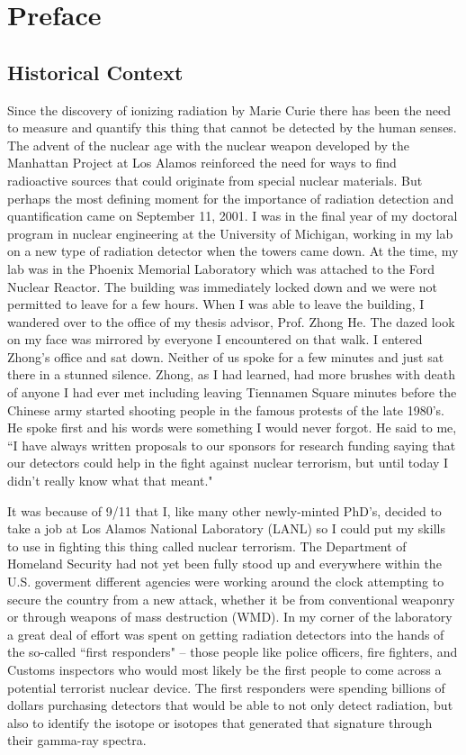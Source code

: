 \chapter{Preface}

\section{Historical Context}

Since the discovery of ionizing radiation by Marie Curie there has been the need to measure and quantify this thing that cannot be detected by the human senses.  The advent of the nuclear age with the nuclear weapon developed by the Manhattan Project at Los Alamos reinforced the need for ways to find radioactive sources that could originate from special nuclear materials.  But perhaps the most defining moment for the importance of radiation detection and quantification came on September 11, 2001.  I was in the final year of my doctoral program in nuclear engineering at the University of Michigan, working in my lab on a new type of radiation detector when the towers came down.  At the time, my lab was in the Phoenix Memorial Laboratory which was attached to the Ford Nuclear Reactor.  The building was immediately locked down and we were not permitted to leave for a few hours.  When I was able to leave the building, I wandered over to the office of my thesis advisor, Prof. Zhong He.  The dazed look on my face was mirrored by everyone I encountered on that walk.  I entered Zhong's office and sat down.  Neither of us spoke for a few minutes and just sat there in a stunned silence.  Zhong, as I had learned, had more brushes with death of anyone I had ever met including leaving Tiennamen Square minutes before the Chinese army started shooting people in the famous protests of the late 1980's.  He spoke first and his words were something I would never forgot.  He said to me, ``I have always written proposals to our sponsors for research funding saying that our detectors could help in the fight against nuclear terrorism, but until today I didn't really know what that meant."

It was because of 9/11 that I, like many other newly-minted PhD's, decided to take a job at Los Alamos National Laboratory (LANL) so I could put my skills to use in fighting this thing called nuclear terrorism.  The Department of Homeland Security had not yet been fully stood up and everywhere within the U.S. goverment different agencies were working around the clock attempting to secure the country from a new attack, whether it be from conventional weaponry or through weapons of mass destruction (WMD).  In my corner of the laboratory a great deal of effort was spent on getting radiation detectors into the hands of the so-called ``first responders" -- those people like police officers, fire fighters, and Customs inspectors who would most likely be the first people to come across a potential terrorist nuclear device.  The first responders were spending billions of dollars purchasing detectors that would be able to not only detect radiation, but also to identify the isotope or isotopes that generated that signature through their gamma-ray spectra.

